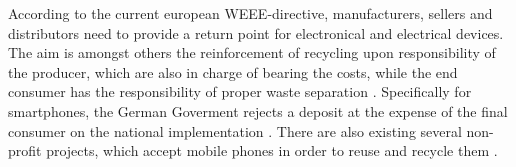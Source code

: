According to the current european WEEE-directive, manufacturers, sellers and distributors need to 
provide a return point for electronical and electrical devices. The aim is amongst others the reinforcement 
of recycling upon responsibility of the producer, which are also in charge of bearing the costs, while the 
end consumer has the responsibility of proper waste separation \cite{EURLEX}. Specifically for smartphones, 
the German Goverment rejects a deposit at the expense of the final consumer on the national implementation \cite{BMUB}. 
There are also existing several non-profit projects, which accept mobile phones in order to reuse and recycle them \cite{NABU, DUH}.